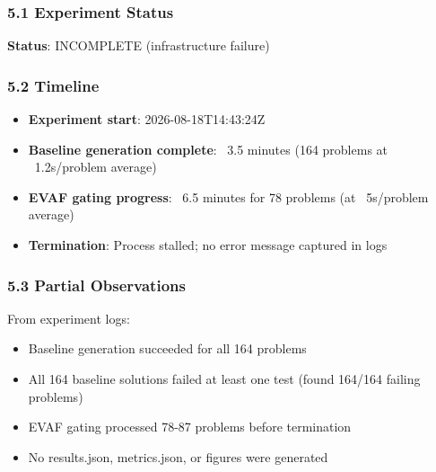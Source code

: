 
\subsubsection{5.1 Experiment Status}

\textbf{Status}: INCOMPLETE (infrastructure failure)

\begin{table}[htbp]
\centering
{}
\end{table}

\subsubsection{5.2 Timeline}

\begin{itemize}
\item \textbf{Experiment start}: 2026-08-18T14:43:24Z
\item \textbf{Baseline generation complete}: ~3.5 minutes (164 problems at ~1.2s/problem average)
\item \textbf{EVAF gating progress}: ~6.5 minutes for 78 problems (at ~5s/problem average)
\item \textbf{Termination}: Process stalled; no error message captured in logs
\end{itemize}

\subsubsection{5.3 Partial Observations}

From experiment logs:
\begin{itemize}
\item Baseline generation succeeded for all 164 problems
\item All 164 baseline solutions failed at least one test (found 164/164 failing problems)
\item EVAF gating processed 78-87 problems before termination
\item No results.json, metrics.json, or figures were generated
\end{itemize}

